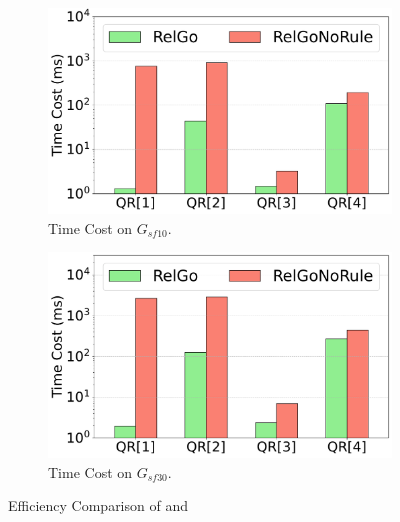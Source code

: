 \begin{figure}[ht]
    \centering
    \begin{subfigure}[b]{.45\linewidth}
        \centering
        \includegraphics[width=\linewidth]{./figures/exp/filter_sf10.pdf}
        \caption{Time Cost on $G_{sf10}$.}
        \label{fig:exp-filter-sf10}
    \end{subfigure}
    \begin{subfigure}[b]{0.45\linewidth}
        \centering
        \includegraphics[width=\linewidth]{./figures/exp/filter_sf30.pdf}
        \caption{Time Cost on $G_{sf30}$.}
        \label{fig:exp-filter-sf30}
    \end{subfigure}
    \caption{Efficiency Comparison of \name and \relgonofi}
    \label{fig:exp-filter}
\end{figure}

